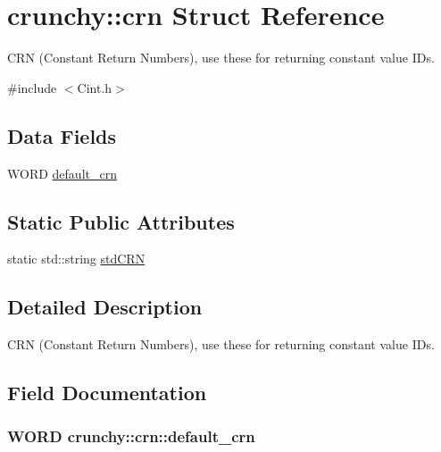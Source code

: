 \hypertarget{structcrunchy_1_1crn}{}\section{crunchy\+:\+:crn Struct Reference}
\label{structcrunchy_1_1crn}


C\+R\+N (Constant Return Numbers), use these for returning constant value I\+D\textquotesingle{}s.  




{\ttfamily \#include $<$Cint.\+h$>$}

\subsection*{Data Fields}
\begin{DoxyCompactItemize}
\item 
W\+O\+R\+D \hyperlink{structcrunchy_1_1crn_af6e0614d6a09fa22b503c55937e974aa}{default\+\_\+crn}
\end{DoxyCompactItemize}
\subsection*{Static Public Attributes}
\begin{DoxyCompactItemize}
\item 
static std\+::string \hyperlink{structcrunchy_1_1crn_ae5f71a10acf2431498d683fee28851db}{std\+C\+R\+N}
\end{DoxyCompactItemize}


\subsection{Detailed Description}
C\+R\+N (Constant Return Numbers), use these for returning constant value I\+D\textquotesingle{}s. 

\subsection{Field Documentation}
\hypertarget{structcrunchy_1_1crn_af6e0614d6a09fa22b503c55937e974aa}{}
\subsubsection[{default\+\_\+crn}]{\setlength{\rightskip}{0pt plus 5cm}W\+O\+R\+D crunchy\+::crn\+::default\+\_\+crn}\label{structcrunchy_1_1crn_af6e0614d6a09fa22b503c55937e974aa}
\hypertarget{structcrunchy_1_1crn_ae5f71a10acf2431498d683fee28851db}{}
